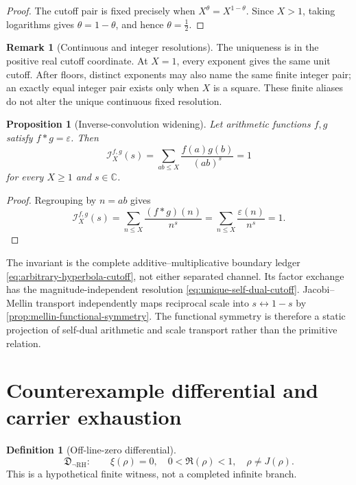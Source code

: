 \documentclass[11pt,a4paper]{article}
\newtheorem{proposition}[theorem]{Proposition}
\theoremstyle{definition}
\newtheorem{definition}[theorem]{Definition}
\newtheorem{remark}[theorem]{Remark}
\newcommand{\C}{\mathbb{C}}
\newcommand{\Dual}{J}
\newcommand{\Invariant}{\mathcal{I}}
\newcommand{\CounterDiff}{\mathfrak{D}_{\neg\mathrm{RH}}}
\begin{document}
\begin{proof}
The cutoff pair is fixed precisely when
$X^\theta=X^{1-\theta}$. Since $X>1$, taking logarithms gives
$\theta=1-\theta$, and hence $\theta=\tfrac12$.
\end{proof}

\begin{remark}[Continuous and integer resolutions]
\label{rem:cutoff-uniqueness-scope}
The uniqueness is in the positive real cutoff coordinate. At $X=1$, every
exponent gives the same unit cutoff. After floors, distinct exponents may also
name the same finite integer pair; an exactly equal integer pair exists only
when $X$ is a square. These finite aliases do not alter the unique continuous
fixed resolution.
\end{remark}

\begin{proposition}[Inverse-convolution widening]
\label{prop:inverse-convolution-universality}
Let arithmetic functions $f,g$ satisfy $f*g=\varepsilon$. Then
\[
  \Invariant_X^{f,g}(s)
  =
  \sum_{ab\leq X}\frac{f(a)g(b)}{(ab)^s}
  =1
\]
for every $X\geq1$ and $s\in\C$.
\end{proposition}

\begin{proof}
Regrouping by $n=ab$ gives
\[
  \Invariant_X^{f,g}(s)
  =\sum_{n\leq X}\frac{(f*g)(n)}{n^s}
  =\sum_{n\leq X}\frac{\varepsilon(n)}{n^s}
  =1.
\]
\end{proof}

\begin{keybox}[title={\bfseries Process invariant and its projection}]
The invariant is the complete additive--multiplicative boundary ledger
\cref{eq:arbitrary-hyperbola-cutoff}, not either separated channel. Its factor
exchange has the magnitude-independent resolution
\cref{eq:unique-self-dual-cutoff}. Jacobi--Mellin transport independently maps
reciprocal scale into $s\leftrightarrow1-s$ by
\cref{prop:mellin-functional-symmetry}. The functional symmetry is therefore a
static projection of self-dual arithmetic and scale transport rather than the
primitive relation.
\end{keybox}

\section{Counterexample differential and carrier exhaustion}
\label{sec:counterexample-differential}

\begin{definition}[Off-line-zero differential]
\begin{equation}
\label{eq:off-line-zero-differential}
  \CounterDiff:
  \qquad
  \xi(\rho)=0,\quad0<\Re(\rho)<1,\quad\rho\neq\Dual(\rho).
\end{equation}
This is a hypothetical finite witness, not a completed infinite branch.
\end{definition}
\end{document}
